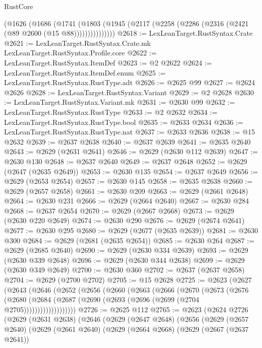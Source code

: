 \begin{lexlean}{RustCore}
\begin{coremodule}
          (@1626
            (@1686
              (@1741
                (@1803 (@1945 (@2117 (@2258 (@2286 (@2316 (@2421 (@89 @2600 (@15 @88)))))))))))))))
@2618 := LexLeanTarget.RustSyntax.Crate
@2621 := LexLeanTarget.RustSyntax.Crate.mk LexLeanTarget.RustSyntax.Profile.core
@2622 := LexLeanTarget.RustSyntax.ItemDef
@2623 := @2 @2622
@2624 := LexLeanTarget.RustSyntax.ItemDef.enum
@2625 := LexLeanTarget.RustSyntax.RustType.adt
@2626 := @2625 @99
@2627 := @2624 @2626
@2628 := LexLeanTarget.RustSyntax.Variant
@2629 := @2 @2628
@2630 := LexLeanTarget.RustSyntax.Variant.mk
@2631 := @2630 @99
@2632 := LexLeanTarget.RustSyntax.RustType
@2633 := @2 @2632
@2634 := LexLeanTarget.RustSyntax.RustType.bool
@2635 := @2633 @2634
@2636 := LexLeanTarget.RustSyntax.RustType.nat
@2637 := @2633 @2636
@2638 := @15 @2632
@2639 := @2637 @2638
@2640 := @2637 @2639
@2641 := @2635 @2640
@2643 := @2629 (@2631 @2641)
@2646 := @2629 (@2630 @112 @2639)
@2647 := @2630 @130
@2648 := @2637 @2640
@2649 := @2637 @2648
@2652 := @2629 (@2647 (@2635 @2649))
@2653 := @2630 @135
@2654 := @2637 @2649
@2656 := @2629 (@2653 @2654)
@2657 := @2630 @145
@2658 := @2635 @2638
@2660 := @2629 (@2657 @2658)
@2661 := @2630 @209
@2663 := @2629 (@2661 @2648)
@2664 := @2630 @231
@2666 := @2629 (@2664 @2640)
@2667 := @2630 @284
@2668 := @2637 @2654
@2670 := @2629 (@2667 @2668)
@2673 := @2629 (@2630 @220 @2649)
@2674 := @2630 @290
@2676 := @2629 (@2674 @2641)
@2677 := @2630 @295
@2680 := @2629 (@2677 (@2635 @2639))
@2681 := @2630 @300
@2684 := @2629 (@2681 (@2635 @2654))
@2685 := @2630 @264
@2687 := @2629 (@2685 @2640)
@2690 := @2629 (@2630 @334 @2639)
@2693 := @2629 (@2630 @339 @2648)
@2696 := @2629 (@2630 @344 @2638)
@2699 := @2629 (@2630 @349 @2649)
@2700 := @2630 @360
@2702 := @2637 (@2637 @2658)
@2704 := @2629 (@2700 @2702)
@2705 := @15 @2628
@2725 := @2623
    (@2627
      (@2643
        (@2646
          (@2652
            (@2656
              (@2660
                (@2663
                  (@2666
                    (@2670
                      (@2673
                        (@2676
                          (@2680
                            (@2684
                              (@2687 (@2690 (@2693 (@2696 (@2699 (@2704 @2705)))))))))))))))))))
@2726 := @2625 @112
@2765 := @2623
    (@2624
      @2726
      (@2629
        (@2631 @2638)
        (@2646
          (@2629
            (@2647 @2648)
            (@2656
              (@2629
                (@2657 @2640)
                (@2629
                  (@2661 @2640)
                  (@2629
                    (@2664 @2668)
                    (@2629
                      (@2667 (@2637 @2641))

\end{coremodule}
\end{lexlean}
